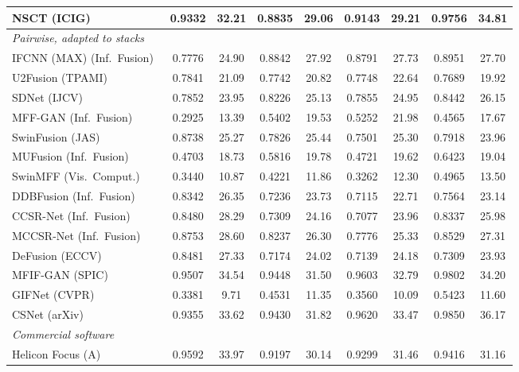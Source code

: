 \begin{table}[!t]
{\begin{tabular}{lcccccccc}
NSCT (ICIG)~\cite{yang2007image} & 0.9332 & 32.21 & 0.8835 & 29.06 & 0.9143 & 29.21 & 0.9756 & 34.81 \\
\midrule
\multicolumn{9}{l}{\textit{Pairwise, adapted to stacks}} \\
IFCNN (MAX) (Inf.\ Fusion)~\cite{zhang2020ifcnn} & 0.7776 & 24.90 & 0.8842 & 27.92 & 0.8791 & 27.73 & 0.8951 & 27.70 \\
U2Fusion (TPAMI)~\cite{xu2020u2fusion} & 0.7841 & 21.09 & 0.7742 & 20.82 & 0.7748 & 22.64 & 0.7689 & 19.92 \\
SDNet (IJCV)~\cite{zhang2021sdnet} & 0.7852 & 23.95 & 0.8226 & 25.13 & 0.7855 & 24.95 & 0.8442 & 26.15 \\
MFF-GAN (Inf.\ Fusion)~\cite{zhang2021mff} & 0.2925 & 13.39 & 0.5402 & 19.53 & 0.5252 & 21.98 & 0.4565 & 17.67 \\
SwinFusion (JAS)~\cite{ma2022swinfusion} & 0.8738 & 25.27 & 0.7826 & 25.44 & 0.7501 & 25.30 & 0.7918 & 23.96 \\
MUFusion (Inf.\ Fusion)~\cite{cheng2023mufusion} & 0.4703 & 18.73 & 0.5816 & 19.78 & 0.4721 & 19.62 & 0.6423 & 19.04 \\
SwinMFF (Vis.\ Comput.)~\cite{xie2024swinmff} & 0.3440 & 10.87 & 0.4221 & 11.86 & 0.3262 & 12.30 & 0.4965 & 13.50 \\
DDBFusion (Inf.\ Fusion)~\cite{zhang2025ddbfusion} & 0.8342 & 26.35 & 0.7236 & 23.73 & 0.7115 & 22.71 & 0.7564 & 23.14 \\
CCSR-Net (Inf.\ Fusion)~\cite{ZHENG2025102974} & 0.8480 & 28.29 & 0.7309 & 24.16 & 0.7077 & 23.96 & 0.8337 & 25.98 \\
MCCSR-Net (Inf.\ Fusion)~\cite{ZHENG2025102974} & 0.8753 & 28.60 & 0.8237 & 26.30 & 0.7776 & 25.33 & 0.8529 & 27.31 \\
DeFusion (ECCV)~\cite{liang2022defusion} & 0.8481 & 27.33 & 0.7174 & 24.02 & 0.7139 & 24.18 & 0.7309 & 23.93 \\
MFIF-GAN (SPIC)~\cite{wang2021mfifgan} & 0.9507 & 34.54 & 0.9448 & 31.50 & 0.9603 & 32.79 & 0.9802 & 34.20 \\
GIFNet (CVPR)~\cite{cheng2025gifnet} & 0.3381 & 9.71 & 0.4531 & 11.35 & 0.3560 & 10.09 & 0.5423 & 11.60 \\
CSNet (arXiv)~\cite{csnet2026} & 0.9355 & 33.62 & 0.9430 & 31.82 & 0.9620 & 33.47 & 0.9850 & 36.17 \\
\midrule
\multicolumn{9}{l}{\textit{Commercial software}} \\
Helicon Focus (A) & 0.9592 & 33.97 & 0.9197 & 30.14 & 0.9299 & 31.46 & 0.9416 & 31.16 \\

\end{tabular}}
\end{table}
